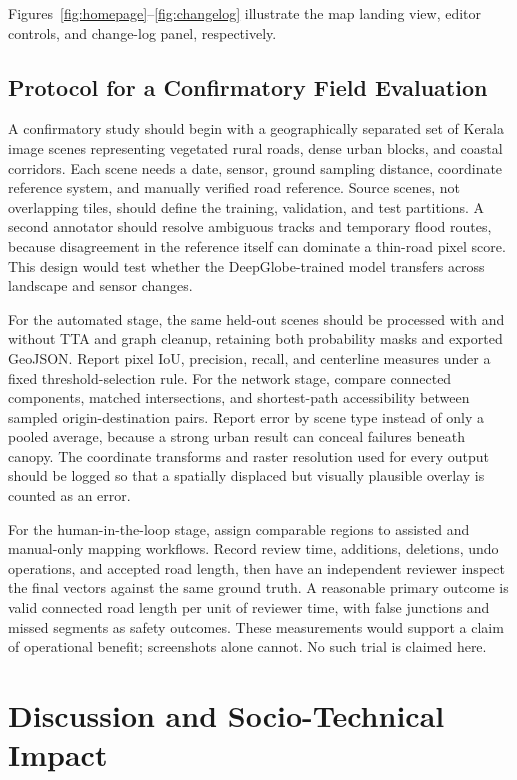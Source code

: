 \documentclass[10pt,a4paper,twocolumn]{article}
\begin{document}
Figures~\ref{fig:homepage}--\ref{fig:changelog} illustrate the map landing view, editor controls, and change-log panel, respectively.

\subsection{Protocol for a Confirmatory Field Evaluation}\label{sec:field_protocol}
A confirmatory study should begin with a geographically separated set of Kerala image scenes representing vegetated rural roads, dense urban blocks, and coastal corridors. Each scene needs a date, sensor, ground sampling distance, coordinate reference system, and manually verified road reference. Source scenes, not overlapping tiles, should define the training, validation, and test partitions. A second annotator should resolve ambiguous tracks and temporary flood routes, because disagreement in the reference itself can dominate a thin-road pixel score. This design would test whether the DeepGlobe-trained model transfers across landscape and sensor changes.

For the automated stage, the same held-out scenes should be processed with and without TTA and graph cleanup, retaining both probability masks and exported GeoJSON. Report pixel IoU, precision, recall, and centerline measures under a fixed threshold-selection rule. For the network stage, compare connected components, matched intersections, and shortest-path accessibility between sampled origin-destination pairs. Report error by scene type instead of only a pooled average, because a strong urban result can conceal failures beneath canopy. The coordinate transforms and raster resolution used for every output should be logged so that a spatially displaced but visually plausible overlay is counted as an error.

For the human-in-the-loop stage, assign comparable regions to assisted and manual-only mapping workflows. Record review time, additions, deletions, undo operations, and accepted road length, then have an independent reviewer inspect the final vectors against the same ground truth. A reasonable primary outcome is valid connected road length per unit of reviewer time, with false junctions and missed segments as safety outcomes. These measurements would support a claim of operational benefit; screenshots alone cannot. No such trial is claimed here.

\section{Discussion and Socio-Technical Impact}
\end{document}

